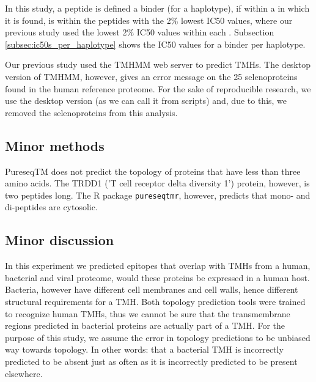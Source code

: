 In this study, a peptide is defined a binder (for a haplotype), 
if within a  in which it is found, 
is within the peptides with the 2\% lowest IC50 values,
where our previous study used the lowest 2\% IC50 values
within each .
Subsection \ref{subsec:ic50s_per_haplotype} shows the IC50 values
for a binder per haplotype.


Our previous study used the TMHMM web server
to predict TMHs.
The desktop version of TMHMM, however, gives an
error message on the 25 selenoproteins found in the human
reference proteome.
For the sake of reproducible research, we use the desktop version (as
we can call it from scripts) and, due to this, we removed the
selenoproteins from this analysis.

\subsection{Minor methods}

PureseqTM does not predict the topology
of proteins that have less than three amino acids. 
The TRDD1 ('T cell receptor delta diversity 1') protein,
however, is two peptides long. 
The R package \verb;pureseqtmr;, however, 
predicts that mono- and di-peptides are cytosolic.

\subsection{Minor discussion}


In this experiment we predicted epitopes that overlap with 
TMHs from a human, bacterial and viral proteome,
would these proteins be expressed in a human host.
Bacteria, however have different cell membranes and cell walls, 
hence different structural requirements for a TMH.
Both topology prediction tools were trained to recognize
human TMHs, thus we cannot be sure that
the transmembrane regions predicted in bacterial proteins
are actually part of a TMH.
For the purpose of this study, we assume the 
error in topology predictions to be unbiased way towards topology.
In other words: that a bacterial TMH is incorrectly
predicted to be absent just as often as it is incorrectly
predicted to be present elsewhere.

